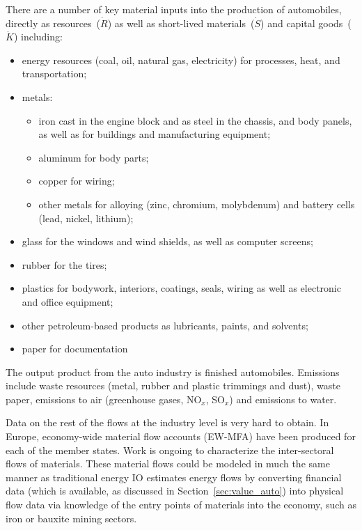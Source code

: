 There are a number of key material inputs into the
production of automobiles, directly as 
resources~($\dot{R}$) as well as short-lived 
materials~($\dot{S}$) and capital goods~($\dot{K}$)
including: 
\begin{itemize}
	\item
		energy resources (coal, oil, natural gas, electricity) 
		for processes, heat,
		and transportation;
	\item
		metals:
			\begin{itemize}
				\item
					iron cast in the engine block and as steel in the chassis,
					and body panels, 
					as well as for buildings and manufacturing equipment;
				\item
					aluminum for body parts;
				\item
					copper for wiring;
				\item
					other metals for alloying 
					(zinc, chromium, molybdenum) and 
					battery cells (lead, nickel, lithium);
			\end{itemize}
	\item
		glass for the windows and wind shields,
		as well as computer screens;
	\item
		rubber for the tires;
	\item
		plastics for bodywork, interiors, coatings, seals, wiring 
		as well as electronic and office equipment;
	\item
		other petroleum-based products as lubricants, 
		paints, and solvents;
	\item
		paper for documentation
\end{itemize}
The output product from the auto industry is finished
automobiles. 
Emissions include waste resources (metal, rubber and plastic trimmings and dust), waste paper, emissions to air (greenhouse gases, NO$_x$, SO$_x$) and emissions to water. 



Data on the rest of the flows at the industry level
is very hard to obtain.
In Europe,
economy-wide material flow accounts (EW-MFA)
have been produced for each of the member 
states.\cite{EUROSTAT2011} 
Work is ongoing to characterize the inter-sectoral
flows of materials.\cite{ConAccount1998}
These material flows could be modeled in much the same
manner as traditional energy IO estimates energy flows by
converting financial data 
(which is available, as discussed in 
Section~\ref{sec:value_auto}) into physical flow data
via knowledge of the entry points of materials into the economy,
such as iron or bauxite mining sectors.

